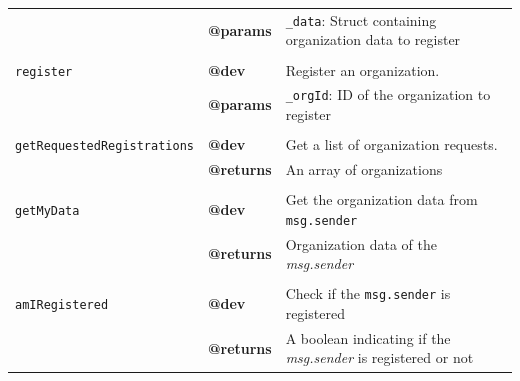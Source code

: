 \begin{table}[H]
{\begin{tabular}{lll}
                          & \textbf{@params}           & \texttt{\_data}: Struct containing organization data to register                                                          \\
                          &                   &                                                                                                                \\ \hline
\texttt{register} & \textbf{@dev}              & Register an organization.                                                                                      \\
                          & \textbf{@params}           & \texttt{\_orgId}: ID of the organization to register                                                                     \\
                          &                   &                                                                                                                \\ \hline
\texttt{getRequestedRegistrations} & \textbf{@dev}              & Get a list of organization requests.                                                                           \\
                          & \textbf{@returns}           & An array of organizations                                                                                          \\
                          &                   &                                                                                                                \\ \hline
\texttt{getMyData} &  \textbf{@dev}            & Get the organization data from \texttt{msg.sender}                                                           \\
                          & \textbf{@returns}           & Organization data of the \textit{msg.sender}                                                                     \\
                          &                   &                                                                                                                \\ \hline
\texttt{amIRegistered} &   \textbf{@dev}           & Check if the \texttt{msg.sender} is registered                                                             \\
                          & \textbf{@returns}           & A boolean indicating if the \textit{msg.sender} is registered or not                                                                      \\

\end{tabular}}
\end{table}
